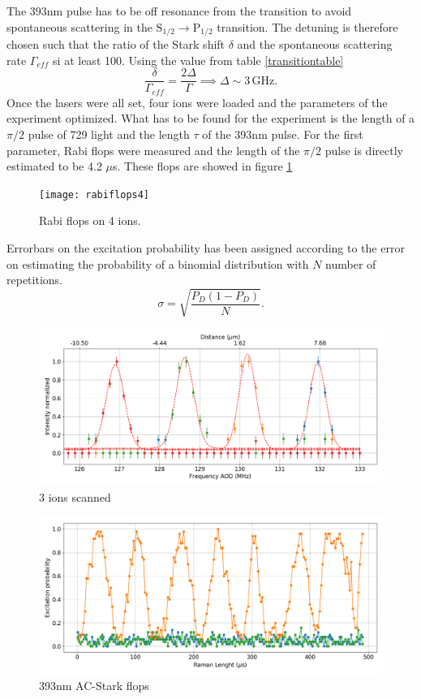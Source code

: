 The 393nm pulse has to be off resonance from the transition to avoid spontaneous scattering in the $\text{S}_{1/2}\to \text{P}_{1/2}$ transition. The detuning is therefore chosen such that the ratio of the Stark shift $\delta$ and the spontaneous scattering rate $\Gamma_{eff}$ si at least 100. Using the value from table \ref{transitiontable}
\begin{equation}
\frac{\delta}{\Gamma_{eff}} = \frac{2\Delta}{\Gamma} \implies \Delta \sim 3\,\text{GHz}.
\end{equation}
Once the lasers were all set, four ions were loaded and the parameters of the experiment optimized. What has to be found for the experiment is the length of a $\pi/2$ pulse of 729 light and the length $\tau$ of the 393nm pulse. For the first parameter, Rabi flops were measured and the length of the $\pi/2$ pulse is directly estimated to be 4.2 $\mu$s. These flops are showed in figure \ref{rabiflops4}
\begin{figure}[H]
\centering
\texttt{[image: rabiflops4]}
\caption{Rabi flops on 4 ions.}
\label{rabiflops4}
\end{figure}
Errorbars on the excitation probability has been assigned according to the error on estimating the probability of a binomial distribution with $N$ number of repetitions.
\begin{equation}
\sigma = \sqrt{\frac{P_{D}(1-P_{D})}{N}}.
\end{equation}



\begin{figure}[H]
\centering
\includegraphics[width=\textwidth]{img/AODscan}
\caption{3 ions scanned}
\end{figure}
\begin{figure}[H]
\centering
\includegraphics[width=\textwidth]{img/ac_stark}
\caption{393nm AC-Stark flops}
\end{figure}

